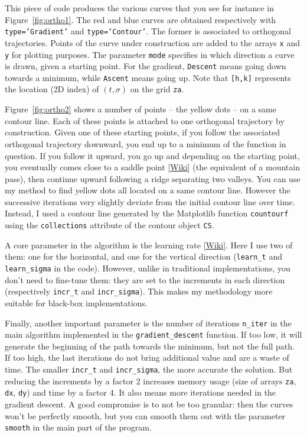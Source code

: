 \documentclass[oneside,10pt]{book}
\begin{document}
This piece of code produces the various curves that you see for instance in Figure~\ref{fig:ortho1}. The red and blue curves are obtained respectively
 with \texttt{type='Gradient'} and \texttt{type='Contour'}. The former is associated to orthogonal trajectories. Points of the curve under construction are added to the arrays \texttt{x} and \texttt{y}  for plotting purposes. The parameter \texttt{mode} specifies in which direction a curve is drawn, given a starting point. For the gradient, \texttt{Descent} means going down towards a minimum, while \texttt{Ascent} means going up. Note that \texttt{[h,k]} represents the location (2D index) of $(t,\sigma)$ on the grid \texttt{za}.


Figure~\ref{fig:ortho2} shows a number of points -- the yellow dots -- on a same contour line. Each of these points is attached to one orthogonal trajectory by construction. Given one of these starting points, if you follow the associated orthogonal trajectory downward, you end up to a minimum of the function in
 question. If you follow it upward, you go up and depending on the starting point, you eventually comes close to a
\textcolor{index}{saddle point} [\href{https://en.wikipedia.org/wiki/Saddle_point}{Wiki}] (the equivalent of a mountain pass), then continue upward following a ridge separating two valleys. You can use my method to find yellow dots all located on a same contour line. However the successive iterations very slightly deviate from the initial contour line over time. Instead, I used a contour line generated by the Matplotlib function \texttt{countourf} using the
\texttt{collections} attribute of the contour object \texttt{CS}.

A core parameter in the algorithm is the
\textcolor{index}{learning rate} [\href{https://en.wikipedia.org/wiki/Learning_rate}{Wiki}]. Here I use two of them: one for the horizontal, and one for the vertical direction (\texttt{learn\_t} and \texttt{learn\_sigma} in the code). However, unlike in traditional implementations, you don't need to fine-tune them: they are set to the increments in each direction
(respectively \texttt{incr\_t} and \texttt{incr\_sigma}). This makes my methodology more suitable for black-box implementations.

Finally, another important parameter is the number of iterations \texttt{n\_iter} in the main algorithm implemented in the
\texttt{gradient\_descent} function. If too low, it will generate the beginning of the path towards the minimum, but not the full path. If too high,
 the last iterations do not bring additional value and are a waste of time. The smaller \texttt{incr\_t} and \texttt{incr\_sigma}, the more accurate the solution. But reducing the increments by a factor 2 increases memory usage (size of arrays \texttt{za}, \texttt{dx}, \texttt{dy}) and time by a factor 4. It also means more iterations needed in the gradient descent. A good compromise is to not be too granular: then the
 curves won't be perfectly smooth, but you can smooth them out with the parameter
\texttt{smooth} in the main part of the program.
\end{document}
